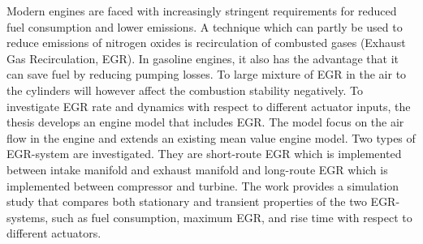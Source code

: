 Modern engines are faced with increasingly stringent requirements for reduced fuel consumption and lower emissions. A technique which can partly be used to reduce emissions of nitrogen oxides is recirculation of combusted gases (Exhaust Gas Recirculation, EGR). In gasoline engines, it also has the advantage that it can save fuel by reducing pumping losses. To large mixture of EGR in the air to the cylinders will however affect the combustion stability negatively. To investigate EGR rate and dynamics with respect to different actuator inputs, the thesis develops an engine model that includes EGR. The model focus on the air flow in the engine and extends an existing mean value engine model. Two types of EGR-system are investigated. They are short-route EGR which is implemented between intake manifold and exhaust manifold and long-route EGR which is implemented between compressor and turbine. The work provides a simulation study that compares both stationary and transient properties of the two EGR-systems, such as fuel consumption, maximum EGR, and rise time with respect to different actuators.
